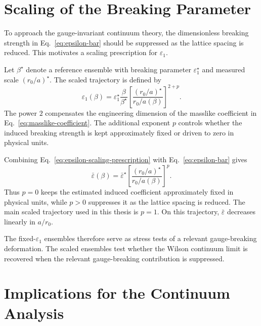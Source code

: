\documentclass[12pt,a4paper,oneside,numbers=noenddot]{scrreprt}
\newcommand{\eps}{\varepsilon}
\newcommand{\latspacing}{a}
\newcommand{\rzero}{r_0}
\begin{document}
\section{Scaling of the Breaking Parameter}
\label{sec:scaling-breaking-parameter}

To approach the gauge-invariant continuum theory, the dimensionless breaking
strength in Eq.~\eqref{eq:epsilon-bar} should be suppressed as the lattice
spacing is reduced. This motivates a scaling prescription for \(\eps_1\).

Let \(\beta^\star\) denote a reference ensemble with breaking parameter
\(\eps_1^\star\) and measured scale
\((\rzero/\latspacing)^\star\). The scaled trajectory is defined by
\begin{equation}
  \eps_1(\beta)
  =
  \eps_1^\star
  \frac{\beta}{\beta^\star}
  \left[
    \frac{
      (\rzero/\latspacing)^\star
    }{
      \rzero/\latspacing(\beta)
    }
  \right]^{2+p}.
  \label{eq:epsilon-scaling-prescription}
\end{equation}
The power \(2\) compensates the engineering dimension of the masslike
coefficient in Eq.~\eqref{eq:masslike-coefficient}. The additional exponent
\(p\) controls whether the induced breaking strength is kept approximately
fixed or driven to zero in physical units.

Combining Eq.~\eqref{eq:epsilon-scaling-prescription} with
Eq.~\eqref{eq:epsilon-bar} gives
\begin{equation}
  \bar\eps(\beta)
  =
  \bar\eps^\star
  \left[
    \frac{
      (\rzero/\latspacing)^\star
    }{
      \rzero/\latspacing(\beta)
    }
  \right]^p .
  \label{eq:epsilon-bar-scaled}
\end{equation}
Thus \(p=0\) keeps the estimated induced coefficient approximately fixed in
physical units, while \(p>0\) suppresses it as the lattice spacing is reduced.
The main scaled trajectory used in this thesis is \(p=1\). On this trajectory,
\(\bar\eps\) decreases linearly in \(\latspacing/\rzero\).

The fixed-\(\eps_1\) ensembles therefore serve as stress tests of a relevant
gauge-breaking deformation. The scaled ensembles test whether the Wilson
continuum limit is recovered when the relevant gauge-breaking contribution is
suppressed.

\section{Implications for the Continuum Analysis}
\label{sec:continuum-implications-breaking}
\end{document}
